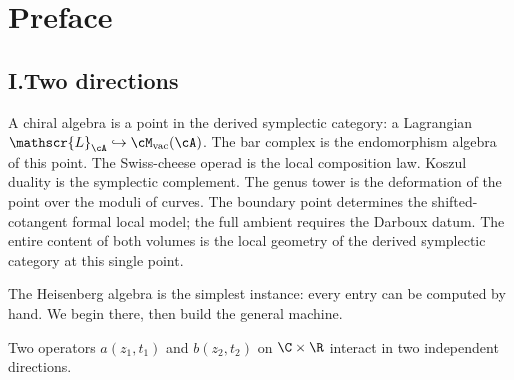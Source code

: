 \providecommand{\cL}{\mathscr{L}}
\providecommand{\Steinb}{\mathfrak{S}}
\providecommand{\cZ}{\mathcal{Z}}
\providecommand{\cH}{\mathcal{H}}
\providecommand{\fg}{\mathfrak{g}}
\providecommand{\cW}{\mathcal{W}}
\providecommand{\gSC}{\mathfrak{g}^{\mathrm{SC}}}
\providecommand{\gAmod}{\mathfrak{g}^{\mathrm{mod}}_\cA}
\providecommand{\Ydg}{Y^{\mathrm{dg}}}
\providecommand{\Zder}{\operatorname{Z}_{\mathrm{der}}}
\providecommand{\Abulk}{A_{\mathrm{bulk}}}
\providecommand{\Bbound}{B_{\partial}}
\providecommand{\mc}{\operatorname{MC}}
\providecommand{\Res}{\operatorname{Res}}
\providecommand{\RHom}{\operatorname{RHom}}
\providecommand{\barB}{\bar{B}}
\providecommand{\barBch}{\bar{B}^{\mathrm{ch}}}
\providecommand{\SCchtop}{\mathsf{SC}^{\mathrm{ch,top}}}
\providecommand{\FM}{\operatorname{FM}}
\providecommand{\Conf}{\operatorname{Conf}}
\providecommand{\id}{\operatorname{id}}
\providecommand{\Ainf}{A_\infty}
\providecommand{\Bbbk}{\mathbb{k}}
\providecommand{\HH}{\operatorname{HH}}
\providecommand{\Omegach}{\Omega^{\mathrm{ch}}}

\chapter*{Preface}

\vspace{1em}

\section*{I.\quad Two directions}

\noindent
A chiral algebra is a point in the derived symplectic category: a Lagrangian
$\cL_\cA \hookrightarrow \cM_{\mathrm{vac}}(\cA)$. The bar complex is the
endomorphism algebra of this point. The Swiss-cheese operad is the local
composition law. Koszul duality is the symplectic complement. The genus tower
is the deformation of the point over the moduli of curves. The boundary point
determines the shifted-cotangent formal local model; the full ambient requires
the Darboux datum. The entire content of both volumes is the local geometry of
the derived symplectic category at this single point.

The Heisenberg algebra is the simplest instance: every entry can be computed by hand. We begin there, then build the general machine.

\medskip
\noindent
Two operators $a(z_1, t_1)$ and $b(z_2, t_2)$ on $\C \times \R$
interact in two independent directions.

